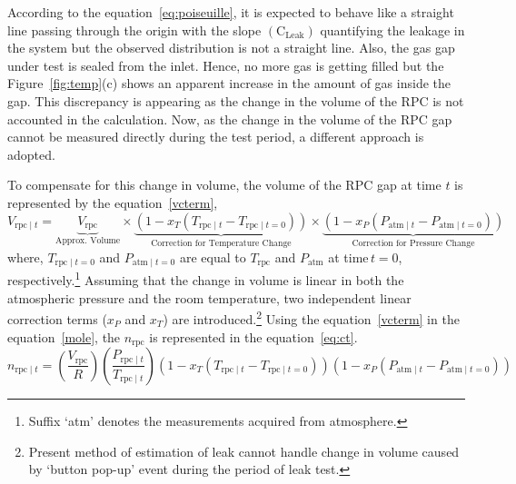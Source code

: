 According to the equation~\ref{eq:poiseuille}, it is expected to behave like a
straight line passing through the origin with the slope
$\left(\textrm{C}_{\textrm{Leak}}\right)$ quantifying the leakage in the system
but the observed distribution is not a straight line. Also, the gas gap under
test is sealed from the inlet. Hence, no more gas is getting filled but the
Figure~\ref{fig:temp}(c) shows an apparent increase in the amount of gas inside
the gap. This discrepancy is appearing as the change in the volume of the RPC
is not accounted in the calculation. Now, as the change in the volume of the
RPC gap cannot be measured directly during the test period, a different
approach is adopted.

To compensate for this change in volume, the volume of the RPC gap at time $t$
is represented by the equation~\ref{vcterm},
\begin{equation}
  V_{\textrm{rpc}\mid t} = \underbrace{V_{\textrm{rpc}}}_{\text{Approx. Volume}}\times\underbrace{\left(1-x_T\left(T_{\textrm{rpc}\mid t}-T_{\textrm{rpc}\mid t=0}\right)\right)}_{\text{Correction for Temperature Change}}\times\underbrace{\left(1-x_P\left(P_{\textrm{atm}\mid t}-P_{\textrm{atm}\mid t=0}\right)\right)}_{\text{Correction for Pressure Change}}\label{vcterm}
\end{equation}
where, $T_{\textrm{rpc}\mid t=0}$ and $P_{\textrm{atm}\mid t=0}$ are equal to
$T_{\textrm{rpc}}$ and $P_{\textrm{atm}}$ at time\,$t=0$, respectively.\footnote{Suffix `atm' denotes the measurements acquired from atmosphere.}
Assuming that the change in volume is linear in both the atmospheric pressure
and the room temperature, two independent linear correction terms ($x_P$ and
$x_T$) are introduced.\footnote{Present method of estimation of leak cannot handle change in volume caused by `button pop-up' event during the period of leak test.}
Using the equation~\ref{vcterm} in the equation~\ref{mole}, the $n_{\textrm{rpc}}$
is represented in the equation~\ref{eq:ct}.
\begin{equation}
  n_{\textrm{rpc}\mid t}=\left(\frac{V_{\textrm{rpc}}}{R}\right)\left(\frac{P_{\textrm{rpc}\mid t}}{T_{\textrm{rpc}\mid t}}\right)\left(1-x_T\left(T_{\textrm{rpc}\mid t}-T_{\textrm{rpc}\mid t=0}\right)\right)\left(1-x_P\left(P_{\textrm{atm}\mid t}-P_{\textrm{atm}\mid t=0}\right)\right) \label{eq:ct}
\end{equation}

